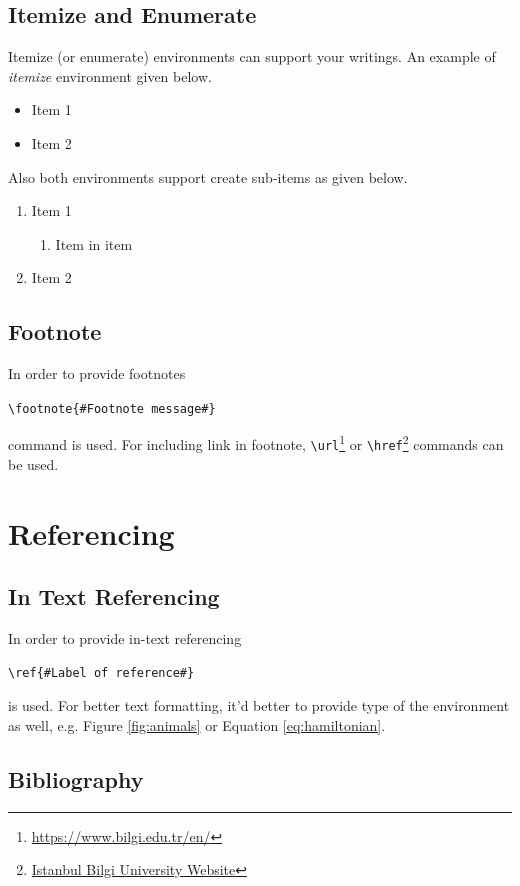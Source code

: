 \documentclass[a4paper,12pt]{article}
\newcommand{\writecommand}[2]{
    \begin{center}
        \texttt{\textbackslash #1\{\##2\#\}} \\
    \end{center}
}
\begin{document}
\subsection{Itemize and Enumerate}
Itemize (or enumerate) environments can support your writings. An example of \textit{itemize} environment given below.

\begin{itemize}
    \item Item 1
    \item Item 2
\end{itemize}

Also both environments support create sub-items as given below.

\begin{enumerate}
    \item Item 1
    \begin{enumerate}
        \item Item in item
    \end{enumerate}
    \item Item 2
\end{enumerate}


\subsection{Footnote}
In order to provide footnotes \writecommand{footnote}{Footnote message} command is used. For including link in footnote, \texttt{\textbackslash url}\footnote{\url{https://www.bilgi.edu.tr/en/}} or \texttt{\textbackslash href}\footnote{\href{https://www.bilgi.edu.tr/en/}{Istanbul Bilgi University Website}} commands can be used.


\section{Referencing}

\subsection{In Text Referencing \label{sec:in-text-ref}}
In order to provide in-text referencing \writecommand{ref}{Label of reference} is used. For better text formatting, it'd better to provide type of the environment as well, e.g. Figure \ref{fig:animals} or Equation \ref{eq:hamiltonian}.

\subsection{Bibliography}
\end{document}
